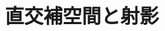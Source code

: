 \documentclass[../../topic_linear-algebra]{subfiles}
\begin{document}
\chapter{直交補空間と射影}



\end{document}
